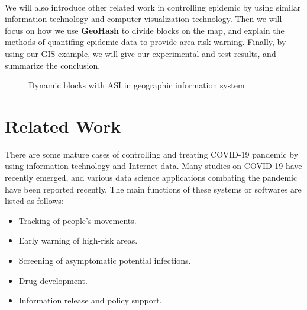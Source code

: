 \documentclass[sigplan,screen]{acmart}
\begin{document}
\\
We will also introduce other related work in controlling epidemic by using similar information technology and computer visualization technology.
Then we will focus on how we use \textbf{GeoHash} to divide blocks on the map, and explain the methods of quantifing epidemic data to provide area risk warning.
Finally, by using our GIS example, we will give our experimental and test results, and summarize the conclusion.
\begin{figure}[hptb]
	\centering
	\caption{Dynamic blocks with ASI in geographic information system}
\end{figure}
\section{Related Work}
There are some mature cases of controlling and treating COVID-19 pandemic by using information technology and Internet data.
Many studies on COVID-19 have recently emerged, and various data science applications combating the pandemic have been reported recently\cite{latif2020leveraging}.
The main functions of these systems or softwares are listed as follows:\cite{jia2020big}
\begin{itemize}
	\item Tracking of people's movements.
	\item Early warning of high-risk areas.
	\item Screening of asymptomatic potential infections.
	\item Drug development.
	\item Information release and policy support.
\end{itemize}
\end{document}
